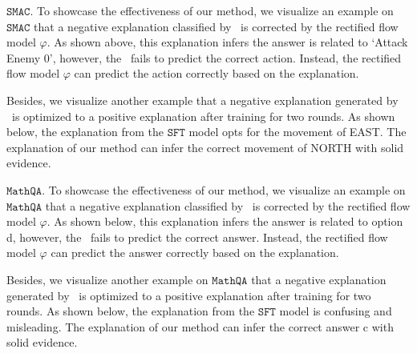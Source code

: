 




\textbf{$\mathtt{SMAC}$}. To showcase the effectiveness of our method, we visualize an example on $\mathtt{SMAC}$ that a negative explanation classified by \rlm~is corrected by the rectified flow model $\varphi$. As shown above, this explanation infers the answer is related to `Attack Enemy 0', however, the \rlm~fails to predict the correct action. Instead, the rectified flow model $\varphi$ can predict the action correctly based on the explanation.

Besides, we visualize another example that a negative explanation generated by \elm~is optimized to a positive explanation after training for two rounds. As shown below, the explanation from the ${\mathtt{SFT}}$ model opts for the movement of EAST. The explanation of our method can infer the correct movement of NORTH with solid evidence.



\textbf{$\mathtt{MathQA}$}. To showcase the effectiveness of our method, we visualize an example on $\mathtt{MathQA}$ that a negative explanation classified by \rlm~is corrected by the rectified flow model $\varphi$. As shown below, this explanation infers the answer is related to option d, however, the \rlm~fails to predict the correct answer. Instead, the rectified flow model $\varphi$ can predict the answer correctly based on the explanation.


Besides, we visualize another example on $\mathtt{MathQA}$ that a negative explanation generated by \elm~is optimized to a positive explanation after training for two rounds. As shown below, the explanation from the ${\mathtt{SFT}}$ model is confusing and misleading. The explanation of our method can infer the correct answer c with solid evidence.






